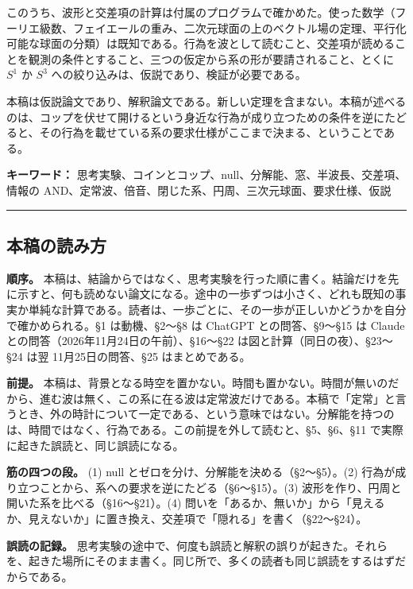 \documentclass[
  a4paper,
]{ltjsarticle}
\begin{document}
このうち、波形と交差項の計算は付属のプログラムで確かめた。使った数学（フーリエ級数、フェイエールの重み、二次元球面の上のベクトル場の定理、平行化可能な球面の分類）は既知である。行為を波として読むこと、交差項が読めることを観測の条件とすること、三つの仮定から系の形が要請されること、とくに
\(S^1\) か \(S^3\) への絞り込みは、仮説であり、検証が必要である。

本稿は仮説論文であり、解釈論文である。新しい定理を含まない。本稿が述べるのは、コップを伏せて開けるという身近な行為が成り立つための条件を逆にたどると、その行為を載せている系の要求仕様がここまで決まる、ということである。

\textbf{キーワード：}
思考実験、コインとコップ、null、分解能、窓、半波長、交差項、情報の
AND、定常波、倍音、閉じた系、円周、三次元球面、要求仕様、仮説

\begin{center}\rule{0.5\linewidth}{0.5pt}\end{center}

\subsection{本稿の読み方}\label{ux672cux7a3fux306eux8aadux307fux65b9}

\textbf{順序。}
本稿は、結論からではなく、思考実験を行った順に書く。結論だけを先に示すと、何も読めない論文になる。途中の一歩ずつは小さく、どれも既知の事実か単純な計算である。読者は、一歩ごとに、その一歩が正しいかどうかを自分で確かめられる。§1
は動機、§2〜§8 は ChatGPT との問答、§9〜§15 は Claude
との問答（2026年11月24日の午前）、§16〜§22
は図と計算（同日の夜）、§23〜§24 は翌 11月25日の問答、§25
はまとめである。

\textbf{前提。}
本稿は、背景となる時空を置かない。時間も置かない。時間が無いのだから、進む波は無く、この系に在る波は定常波だけである。本稿で「定常」と言うとき、外の時計について一定である、という意味ではない。分解能を持つのは、時間ではなく、行為である。この前提を外して読むと、§5、§6、§11
で実際に起きた誤読と、同じ誤読になる。

\textbf{筋の四つの段。} (1) null
とゼロを分け、分解能を決める（§2〜§5）。(2)
行為が成り立つことから、系への要求を逆にたどる（§6〜§15）。(3)
波形を作り、円周と開いた系を比べる（§16〜§21）。(4)
問いを「あるか、無いか」から「見えるか、見えないか」に置き換え、交差項で「隠れる」を書く（§22〜§24）。

\textbf{誤読の記録。}
思考実験の途中で、何度も誤読と解釈の誤りが起きた。それらを、起きた場所にそのまま書く。同じ所で、多くの読者も同じ誤読をするはずだからである。
\end{document}
